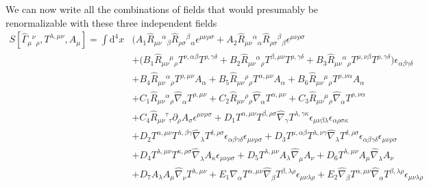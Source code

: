 \documentclass[%
  showpacs,showkeys,prd,superscriptaddress]{revtex4-1}
\def\md{{\mathrm{d}}}
\begin{document}
We can now write all the combinations of fields that would presumably be renormalizable with these three independent fields
\begin{equation}
  \begin{split}
    \label{3+1full}
     S[\hat\Gamma_{\mu}{}^{\nu}{}_\rho,T^{\lambda,\mu\nu},A_\mu] =\int\md^4x & \Bigg( A_1 \hat R_{\mu\nu}{}^{\alpha}{}_\beta \hat R_{\rho\sigma}{}^{\beta}{}_\alpha\epsilon^{\mu\nu\rho\sigma}+A_2 \hat R_{\mu\nu}{}^{\alpha}{}_\alpha \hat R_{\rho\sigma}{}^{\beta}{}_\beta\epsilon^{\mu\nu\rho\sigma}
    \\
    & +\Big(B_1 \hat R_{\mu\nu}{}^{\mu}{}_\rho T^{\nu,\alpha\beta}T^{\rho,\gamma\delta}+B_2 \hat R_{\mu\nu}{}^{\alpha}{}_\rho T^{\beta,\mu\nu}T^{\rho,\gamma\delta}+B_3\hat R_{\mu\nu}{}^{\alpha}{}_\rho T^{\mu,\nu\beta}T^{\rho,\gamma\delta}\Big)\epsilon_{\alpha\beta\gamma\delta}
    \\
    & +B_4\hat R_{\mu\nu}{}^{\alpha}{}_\rho T^{\rho,\mu\nu}A_\alpha+B_5\hat R_{\mu\nu}{}^{\rho}{}_\rho T^{\alpha,\mu\nu}A_\alpha+B_6 \hat R_{\mu\nu}{}^{\mu}{}_\rho T^{\rho,\nu\alpha}A_\alpha 
    \\
    & +C_1\hat R_{\mu\nu}{}^{\alpha}{}_\rho \hat\nabla_\alpha T^{\rho,\mu\nu}+C_2\hat R_{\mu\nu}{}^{\rho}{}_\rho \hat\nabla_\alpha T^{\alpha,\mu\nu} +C_3 \hat R_{\mu\nu}{}^{\mu}{}_\rho \hat\nabla_\alpha T^{\rho,\nu\alpha}
    \\
    & +C_4\hat R_{\mu\nu}{}^{\tau}{}_\tau \partial_\rho A_\sigma \epsilon^{\mu\nu\rho\sigma}+D_1T^{\alpha,\mu\nu}T^{\beta,\rho\sigma}\hat\nabla_\gamma T^{\lambda,\gamma\kappa}\epsilon_{\mu\nu\beta\lambda}\epsilon_{\alpha\rho\sigma\kappa}
    \\  
    & + D_2T^{\alpha,\mu\nu}T^{\lambda,\beta\gamma}\hat\nabla_\lambda T^{\delta,\rho\sigma}\epsilon_{\alpha\beta\gamma\delta}\epsilon_{\mu\nu\rho\sigma}+D_3T^{\mu,\alpha\beta}T^{\lambda,\nu\gamma}\hat\nabla_\lambda T^{\delta,\rho\sigma}\epsilon_{\alpha\beta\gamma\delta}\epsilon_{\mu\nu\rho\sigma}
    \\
    & + D_4T^{\lambda,\mu\nu}T^{\kappa,\rho\sigma}\hat\nabla_\lambda A_\kappa \epsilon_{\mu\nu\rho\sigma}+D_5T^{\lambda,\mu\nu}A_\lambda\hat\nabla_\mu A_\nu +D_6T^{\lambda,\mu\nu}A_\mu\hat\nabla_\lambda A_\nu
    \\
    & +D_7A_\lambda  A_\mu\hat\nabla_\nu T^{\lambda,\mu\nu} +E_1\hat\nabla_\alpha T^{\alpha,\mu\nu}\hat\nabla_\beta T^{\beta,\lambda\rho}\epsilon_{\mu\nu\lambda\rho}+E_2\hat\nabla_\beta T^{\alpha,\mu\nu}\hat\nabla_\alpha T^{\beta,\lambda\rho}\epsilon_{\mu\nu\lambda\rho}
    \\

\end{split}
\end{equation}
\end{document}

